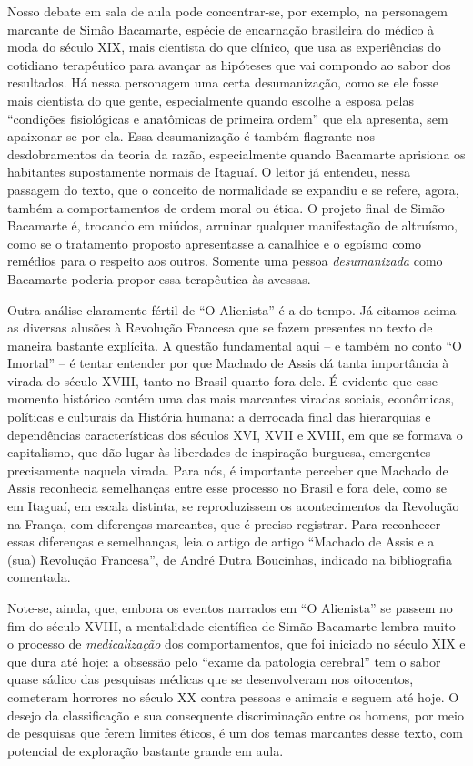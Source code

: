 \documentclass{extarticle}
\begin{document}
Nosso debate em sala de aula pode concentrar-se, por exemplo, na
personagem marcante de Simão Bacamarte, espécie de encarnação brasileira
do médico à moda do século XIX, mais cientista do que clínico, que usa
as experiências do cotidiano terapêutico para avançar as hipóteses que
vai compondo ao sabor dos resultados. Há nessa personagem uma certa
desumanização, como se ele fosse mais cientista do que gente,
especialmente quando escolhe a esposa pelas ``condições fisiológicas e
anatômicas de primeira ordem'' que ela apresenta, sem apaixonar-se por
ela. Essa desumanização é também flagrante nos desdobramentos da teoria
da razão, especialmente quando Bacamarte aprisiona os habitantes
supostamente normais de Itaguaí. O leitor já entendeu, nessa passagem do
texto, que o conceito de normalidade se expandiu e se refere, agora,
também a comportamentos de ordem moral ou ética. O projeto final de
Simão Bacamarte é, trocando em miúdos, arruinar qualquer manifestação de
altruísmo, como se o tratamento proposto apresentasse a canalhice e o
egoísmo como remédios para o respeito aos outros. Somente uma pessoa
\emph{desumanizada} como Bacamarte poderia propor essa terapêutica às
avessas.

Outra análise claramente fértil de ``O Alienista'' é a do tempo. Já
citamos acima as diversas alusões à Revolução Francesa que se fazem
presentes no texto de maneira bastante explícita. A questão fundamental
aqui -- e também no conto ``O Imortal'' -- é tentar entender por que
Machado de Assis dá tanta importância à virada do século XVIII, tanto no
Brasil quanto fora dele. É evidente que esse momento histórico contém
uma das mais marcantes viradas sociais, econômicas, políticas e
culturais da História humana: a derrocada final das hierarquias e
dependências características dos séculos XVI, XVII e XVIII, em que se
formava o capitalismo, que dão lugar às liberdades de inspiração
burguesa, emergentes precisamente naquela virada. Para nós, é importante
perceber que Machado de Assis reconhecia semelhanças entre esse processo
no Brasil e fora dele, como se em Itaguaí, em escala distinta, se
reproduzissem os acontecimentos da Revolução na França, com diferenças
marcantes, que é preciso registrar. Para reconhecer essas diferenças e
semelhanças, leia o artigo de artigo ``Machado de Assis e a (sua)
Revolução Francesa'', de André Dutra Boucinhas, indicado na bibliografia
comentada.

Note-se, ainda, que, embora os eventos narrados em ``O Alienista'' se
passem no fim do século XVIII, a mentalidade científica de Simão
Bacamarte lembra muito o processo de \emph{medicalização} dos
comportamentos, que foi iniciado no século XIX e que dura até hoje: a
obsessão pelo ``exame da patologia cerebral'' tem o sabor quase sádico
das pesquisas médicas que se desenvolveram nos oitocentos, cometeram
horrores no século XX contra pessoas e animais e seguem até hoje. O
desejo da classificação e sua consequente discriminação entre os homens,
por meio de pesquisas que ferem limites éticos, é um dos temas marcantes
desse texto, com potencial de exploração bastante grande em aula.
\end{document}
